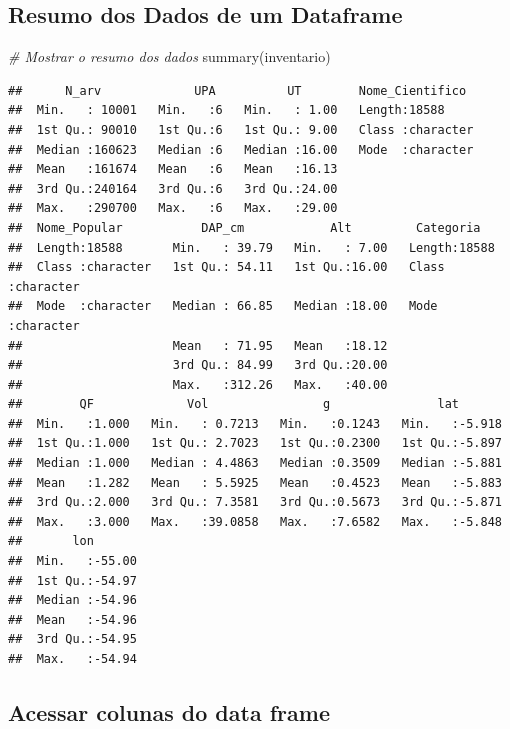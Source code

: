 \documentclass[
]{article}
\newenvironment{Shaded}{\begin{snugshade}}{\end{snugshade}}
\newcommand{\CommentTok}[1]{\textcolor[rgb]{0.56,0.35,0.01}{\textit{#1}}}
\newcommand{\FunctionTok}[1]{\textcolor[rgb]{0.00,0.00,0.00}{#1}}
\newcommand{\NormalTok}[1]{#1}
\begin{document}
\hypertarget{resumo-dos-dados-de-um-dataframe}{%
\subsection{Resumo dos Dados de um
Dataframe}\label{resumo-dos-dados-de-um-dataframe}}

\begin{Shaded}
\begin{Highlighting}[]
\CommentTok{\# Mostrar o resumo dos dados}
\FunctionTok{summary}\NormalTok{(inventario)}
\end{Highlighting}
\end{Shaded}

\begin{verbatim}
##      N_arv             UPA          UT        Nome_Cientifico   
##  Min.   : 10001   Min.   :6   Min.   : 1.00   Length:18588      
##  1st Qu.: 90010   1st Qu.:6   1st Qu.: 9.00   Class :character  
##  Median :160623   Median :6   Median :16.00   Mode  :character  
##  Mean   :161674   Mean   :6   Mean   :16.13                     
##  3rd Qu.:240164   3rd Qu.:6   3rd Qu.:24.00                     
##  Max.   :290700   Max.   :6   Max.   :29.00                     
##  Nome_Popular           DAP_cm            Alt         Categoria        
##  Length:18588       Min.   : 39.79   Min.   : 7.00   Length:18588      
##  Class :character   1st Qu.: 54.11   1st Qu.:16.00   Class :character  
##  Mode  :character   Median : 66.85   Median :18.00   Mode  :character  
##                     Mean   : 71.95   Mean   :18.12                     
##                     3rd Qu.: 84.99   3rd Qu.:20.00                     
##                     Max.   :312.26   Max.   :40.00                     
##        QF             Vol                g               lat        
##  Min.   :1.000   Min.   : 0.7213   Min.   :0.1243   Min.   :-5.918  
##  1st Qu.:1.000   1st Qu.: 2.7023   1st Qu.:0.2300   1st Qu.:-5.897  
##  Median :1.000   Median : 4.4863   Median :0.3509   Median :-5.881  
##  Mean   :1.282   Mean   : 5.5925   Mean   :0.4523   Mean   :-5.883  
##  3rd Qu.:2.000   3rd Qu.: 7.3581   3rd Qu.:0.5673   3rd Qu.:-5.871  
##  Max.   :3.000   Max.   :39.0858   Max.   :7.6582   Max.   :-5.848  
##       lon        
##  Min.   :-55.00  
##  1st Qu.:-54.97  
##  Median :-54.96  
##  Mean   :-54.96  
##  3rd Qu.:-54.95  
##  Max.   :-54.94
\end{verbatim}

\hypertarget{acessar-colunas-do-data-frame}{%
\subsection{Acessar colunas do data
frame}\label{acessar-colunas-do-data-frame}}
\end{document}
